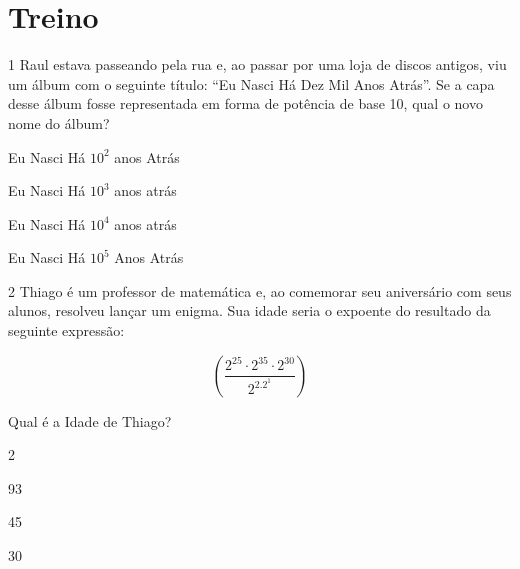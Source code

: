 \section{Treino}

\num{1} Raul estava passeando pela rua e, ao passar por uma loja de discos
antigos, viu um álbum com o seguinte título: ``Eu Nasci Há Dez Mil Anos
Atrás''. Se a capa desse álbum fosse representada em forma de potência
de base 10, qual o novo nome do álbum?

\begin{escolha}
\item Eu Nasci Há $10^2$ anos Atrás
\item Eu Nasci Há $10^3$ anos atrás
\item Eu Nasci Há $10^4$ anos atrás
\item Eu Nasci Há $10^5$ Anos Atrás
\end{escolha}









\num{2} Thiago é um professor de matemática e, ao comemorar seu aniversário
com seus alunos, resolveu lançar um enigma. Sua idade seria o expoente
do resultado da seguinte expressão:

$$(\frac{2^{25} \cdot 2^{35} \cdot 2^{30}} {2^2.2^1})$$

Qual é a Idade de Thiago?

\begin{escolha}
\item 2
\item 93
\item 45
\item 30
\end{escolha}


